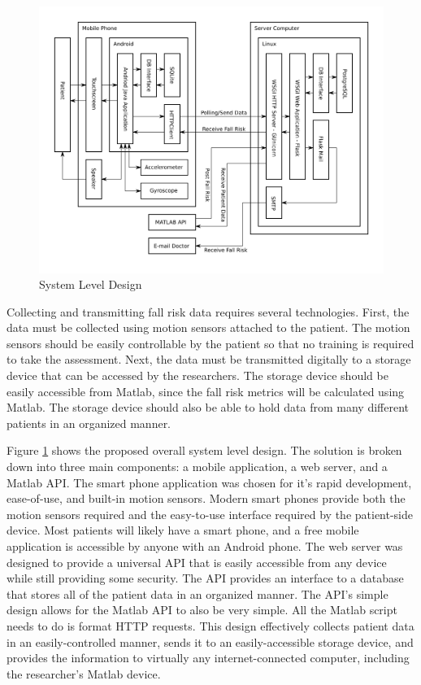 \documentclass[conference]{IEEEtran}
\begin{document}
\begin{figure}[!htb]
\centering
\includegraphics[scale=0.3]{img/systemdesign.png}
\caption{System Level Design}
\label{systemleveldesign}
\end{figure}

Collecting and transmitting fall risk data requires several technologies. First, the data must be collected using motion sensors attached to the patient. The motion sensors should be easily controllable by the patient so that no training is required to take the assessment. Next, the data must be transmitted digitally to a storage device that can be accessed by the researchers. The storage device should be easily accessible from Matlab, since the fall risk metrics will be calculated using Matlab. The storage device should also be able to hold data from many different patients in an organized manner.

Figure \ref{systemleveldesign} shows the proposed overall system level design. The solution is broken down into three main components: a mobile application, a web server, and a Matlab API. The smart phone application was chosen for it's rapid development, ease-of-use, and built-in motion sensors. Modern smart phones provide both the motion sensors required and the easy-to-use interface required by the patient-side device. Most patients will likely have a smart phone, and a free mobile application is accessible by anyone with an Android phone. The web server was designed to provide a universal API that is easily accessible from any device while still providing some security. The API provides an interface to a database that stores all of the patient data in an organized manner. The API's simple design allows for the Matlab API to also be very simple. All the Matlab script needs to do is format HTTP requests. This design effectively collects patient data in an easily-controlled manner, sends it to an easily-accessible storage device, and provides the information to virtually any internet-connected computer, including the researcher's Matlab device.
\end{document}

